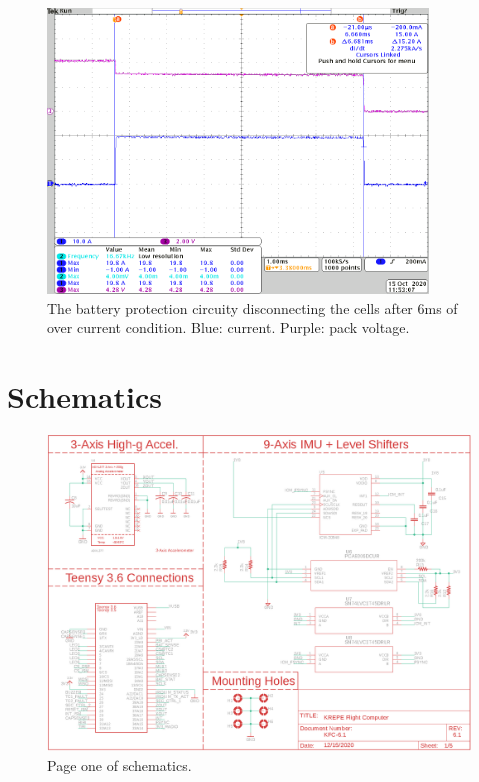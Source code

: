 \documentclass{article}
\begin{document}
\begin{figure}[H]
	\centering
	\includegraphics[width=0.9\textwidth]{images/over-current.png}
	\caption{The battery protection circuity disconnecting the cells after 6ms of over current condition. Blue: current. Purple: pack voltage.}
	\label{fig:over-current}
\end{figure}




\appendix


\section{Schematics}
\label{appa}

\begin{figure}[H]
    \centering
    \includegraphics[width=\textwidth]{images/page1.png}
    \caption{Page one of schematics.}
    \label{fig:page1-2}
\end{figure}
\end{document}
